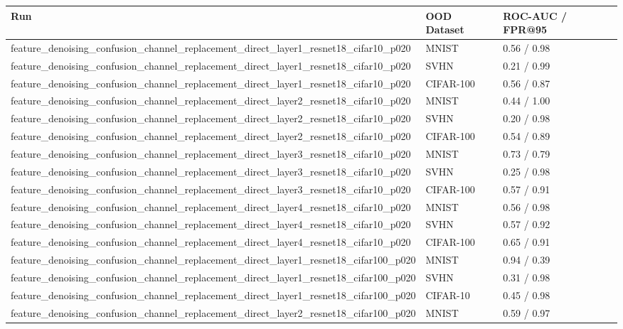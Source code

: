 \begin{tabular}{lll}
\toprule
Run & OOD Dataset & ROC-AUC / FPR@95 \\
\midrule
feature\_denoising\_confusion\_channel\_replacement\_direct\_layer1\_resnet18\_cifar10\_p020 & MNIST & 0.56 / 0.98 \\
feature\_denoising\_confusion\_channel\_replacement\_direct\_layer1\_resnet18\_cifar10\_p020 & SVHN & 0.21 / 0.99 \\
feature\_denoising\_confusion\_channel\_replacement\_direct\_layer1\_resnet18\_cifar10\_p020 & CIFAR-100 & 0.56 / 0.87 \\
feature\_denoising\_confusion\_channel\_replacement\_direct\_layer2\_resnet18\_cifar10\_p020 & MNIST & 0.44 / 1.00 \\
feature\_denoising\_confusion\_channel\_replacement\_direct\_layer2\_resnet18\_cifar10\_p020 & SVHN & 0.20 / 0.98 \\
feature\_denoising\_confusion\_channel\_replacement\_direct\_layer2\_resnet18\_cifar10\_p020 & CIFAR-100 & 0.54 / 0.89 \\
feature\_denoising\_confusion\_channel\_replacement\_direct\_layer3\_resnet18\_cifar10\_p020 & MNIST & 0.73 / 0.79 \\
feature\_denoising\_confusion\_channel\_replacement\_direct\_layer3\_resnet18\_cifar10\_p020 & SVHN & 0.25 / 0.98 \\
feature\_denoising\_confusion\_channel\_replacement\_direct\_layer3\_resnet18\_cifar10\_p020 & CIFAR-100 & 0.57 / 0.91 \\
feature\_denoising\_confusion\_channel\_replacement\_direct\_layer4\_resnet18\_cifar10\_p020 & MNIST & 0.56 / 0.98 \\
feature\_denoising\_confusion\_channel\_replacement\_direct\_layer4\_resnet18\_cifar10\_p020 & SVHN & 0.57 / 0.92 \\
feature\_denoising\_confusion\_channel\_replacement\_direct\_layer4\_resnet18\_cifar10\_p020 & CIFAR-100 & 0.65 / 0.91 \\
feature\_denoising\_confusion\_channel\_replacement\_direct\_layer1\_resnet18\_cifar100\_p020 & MNIST & 0.94 / 0.39 \\
feature\_denoising\_confusion\_channel\_replacement\_direct\_layer1\_resnet18\_cifar100\_p020 & SVHN & 0.31 / 0.98 \\
feature\_denoising\_confusion\_channel\_replacement\_direct\_layer1\_resnet18\_cifar100\_p020 & CIFAR-10 & 0.45 / 0.98 \\
feature\_denoising\_confusion\_channel\_replacement\_direct\_layer2\_resnet18\_cifar100\_p020 & MNIST & 0.59 / 0.97 \\

\end{tabular}
